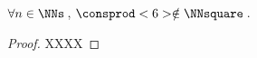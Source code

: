 \begin{fact} \label{case-7}
	 $\forall n \in \NNs$\,, $\consprod<6> \notin \NNsquare$\,.
\end{fact}




\begin{proof}
	XXXX
\end{proof}

